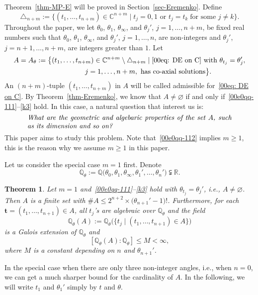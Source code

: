 \documentclass[10pt,a4paper]{amsart}
\numberwithin{equation}{section}
\newtheorem{Theorem}{Theorem}[section]
\def\Q{\mathbb Q}
\def\R{\mathbb R}
\begin{document}
Theorem~\ref{thm-MP-E} will be proved in Section~\ref{sec-Eremenko}.
Define
\[
 \triangle_{n+m}:=\bigl\{(t_1,\dots,t_{n+m})\in \mathbb{C}^{n+m}\mid
 t_j=0,1 \text{ or } t_j=t_k\;\text{for some $j\neq k$}\bigr\}.
\]
Throughout the paper, we let $\theta_0$, $\theta_1$,
$\theta_\infty$, and $\theta_j'$, $j=1,\dots,n+m$, be fixed real
numbers such that $\theta_0$, $\theta_1$, $\theta_\infty$, and
$\theta_j'$, $j=1,\dots,n$, are non-integers and $\theta_j'$,
$j=n+1,\dots,n+m$, are integers greater than $1$.
Let
\begin{gather}
 A=A_\theta:=\bigl\{(t_1,\dots,t_{n+m})\in \mathbb{C}^{n+m}\setminus
 \triangle_{n+m}\mid \text{\eqref{00eq: DE on C}
 with}\ \theta_{t_j}=\theta_j',
\nonumber\\ \hphantom{ A=A_\theta:=\{}{}
j=1,\dots,n+m, \
 \text{has co-axial solutions}\bigr\}.\label{eq: set A}
\end{gather}
An $(n+m)$-tuple $(t_1,\dots,t_{n+m})$ in $A$ will be called
admissible for~\eqref{00eq: DE on C}.
By Theorem~\ref{thm-Eremenko}, we know that $A\neq\varnothing$ if and
only if~\eqref{00e0qq-111}--\eqref{k3} hold. In this case, a natural
question that interest us is:
\[\parbox{\dimexpr\linewidth-5em}{\it
 What are the geometric and algebaric properties of the set $A$, such as its dimension and so on?
 }\]
This paper aims to study this problem. Note that~\eqref{00e0qq-112}
implies $m\geq 1$, this is the reason why we assume $m\geq 1$ in this paper.

Let us consider the special case $m=1$ first. Denote
\[
 \Q_{\theta}:=\Q\bigl(\theta_0,\theta_1,\theta_\infty,\theta_1',
 \dots,\theta_n'\bigr)\subsetneqq \R.
\]


\begin{Theorem}\label{00thm-2-2}
Let $m=1$ and~\eqref{00e0qq-111}--\eqref{k3} hold with
$\theta_{t_j}=\theta_j'$, i.e., $A\neq\varnothing$.
Then $A$ is a finite set with $\# A\leq
2^{n+2}\times\bigl(\theta_{n+1}'-1\bigr)!$. Furthermore, for each
$\boldsymbol t=(t_1,\dots,t_{n+1})\in A$, all $t_j$'s are algebraic
over $\Q_{\theta}$ and the field
\[\Q_\theta(A):=\Q_{\theta}\bigl(\bigl\{t_j \mid (t_1,\dots,t_{n+1})\in A\bigr\}\bigr)\]
is a Galois extension of $\Q_{\theta}$ and
\[[\Q_\theta(A) : \Q_\theta]\leq M<\infty,\]
where $M$ is a constant depending on $n$ and $\theta_{n+1}'$.
\end{Theorem}


In the special case when there are only three
non-integer angles, i.e., when $n=0$, we can get a much sharper bound
for the cardinality of $A$. In the following, we will write
$t_1$ and $\theta_1'$ simply by $t$ and $\theta$.
\end{document}
